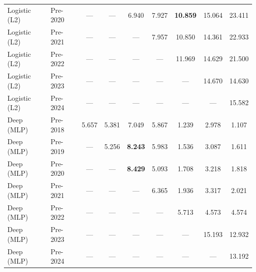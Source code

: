 \begin{table}[htbp]
{\begin{tabular}{l lccccccc}
Logistic (L2) & Pre-2020 & --- & --- & 6.940 & 7.927 & \textbf{10.859} & 15.064 & 23.411 \\
Logistic (L2) & Pre-2021 & --- & --- & --- & 7.957 & 10.850 & 14.361 & 22.933 \\
Logistic (L2) & Pre-2022 & --- & --- & --- & --- & 11.969 & 14.629 & 21.500 \\
Logistic (L2) & Pre-2023 & --- & --- & --- & --- & --- & 14.670 & 14.630 \\
Logistic (L2) & Pre-2024 & --- & --- & --- & --- & --- & --- & 15.582 \\
Deep (MLP) & Pre-2018 & 5.657 & 5.381 & 7.049 & 5.867 & 1.239 & 2.978 & 1.107 \\
Deep (MLP) & Pre-2019 & --- & 5.256 & \textbf{8.243} & 5.983 & 1.536 & 3.087 & 1.611 \\
Deep (MLP) & Pre-2020 & --- & --- & \textbf{8.429} & 5.093 & 1.708 & 3.218 & 1.818 \\
Deep (MLP) & Pre-2021 & --- & --- & --- & 6.365 & 1.936 & 3.317 & 2.021 \\
Deep (MLP) & Pre-2022 & --- & --- & --- & --- & 5.713 & 4.573 & 4.574 \\
Deep (MLP) & Pre-2023 & --- & --- & --- & --- & --- & 15.193 & 12.932 \\
Deep (MLP) & Pre-2024 & --- & --- & --- & --- & --- & --- & 13.192 \\
\bottomrule
\end{tabular}%
}
\end{table}